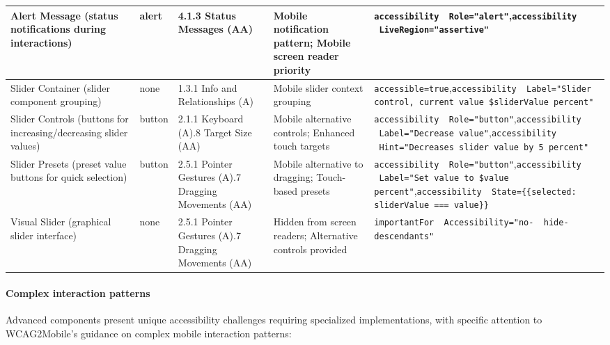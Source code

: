 \begin{longtable}[c]{|C{2.5cm}|C{2cm}|C{2.8cm}|C{2.8cm}|C{4.7cm}|}
\hline
Alert Message (status notifications during interactions) & alert & 4.1.3 Status Messages (AA) & Mobile notification pattern; Mobile screen reader priority & \texttt{accessibility \ Role="alert"},\newline \texttt{accessibility \ LiveRegion="assertive"} \\
\hline
Slider Container (slider component grouping) & none & 1.3.1 Info and Relationships (A) & Mobile slider context grouping & \texttt{accessible=true},\newline \texttt{accessibility \ Label="Slider control, current value \${sliderValue} percent"} \\
\hline
Slider Controls (buttons for increasing/decreasing slider values) & button & 2.1.1 Keyboard (A).8 Target Size (AA) & Mobile alternative controls; Enhanced touch targets & \texttt{accessibility \ Role="button"},\newline \texttt{accessibility \ Label="Decrease value"},\newline \texttt{accessibility \ Hint="Decreases slider value by 5 percent"} \\
\hline
Slider Presets (preset value buttons for quick selection) & button & 2.5.1 Pointer Gestures (A).7 Dragging Movements (AA) & Mobile alternative to dragging; Touch-based presets & \texttt{accessibility \ Role="button"},\newline \texttt{accessibility \ Label="Set value to \${value} percent"},\newline \texttt{accessibility \ State=\{\{selected: sliderValue === value\}\}} \\
\hline
Visual Slider (graphical slider interface) & none & 2.5.1 Pointer Gestures (A).7 Dragging Movements (AA) & Hidden from screen readers; Alternative controls provided & \texttt{importantFor \ Accessibility="no- \ hide-descendants"} \\
\end{longtable}
\FloatBarrier

\paragraph{Complex interaction patterns}

Advanced components present unique accessibility challenges requiring specialized implementations, with specific attention to WCAG2Mobile's guidance on complex mobile interaction patterns:

